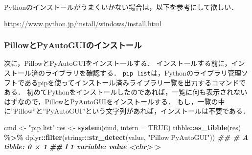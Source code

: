 \documentclass[
]{article}
\newenvironment{Shaded}{\begin{snugshade}}{\end{snugshade}}
\newcommand{\AttributeTok}[1]{\textcolor[rgb]{0.13,0.29,0.53}{#1}}
\newcommand{\ConstantTok}[1]{\textcolor[rgb]{0.56,0.35,0.01}{#1}}
\newcommand{\DocumentationTok}[1]{\textcolor[rgb]{0.56,0.35,0.01}{\textbf{\textit{#1}}}}
\newcommand{\FunctionTok}[1]{\textcolor[rgb]{0.13,0.29,0.53}{\textbf{#1}}}
\newcommand{\NormalTok}[1]{#1}
\newcommand{\OtherTok}[1]{\textcolor[rgb]{0.56,0.35,0.01}{#1}}
\newcommand{\SpecialCharTok}[1]{\textcolor[rgb]{0.81,0.36,0.00}{\textbf{#1}}}
\newcommand{\StringTok}[1]{\textcolor[rgb]{0.31,0.60,0.02}{#1}}
\begin{document}
Pythonのインストールがうまくいかない場合は，以下を参考にして欲しい．

\url{https://www.python.jp/install/windows/install.html}

\hypertarget{pillowux3068pyautoguiux306eux30a4ux30f3ux30b9ux30c8ux30fcux30eb}{%
\subsubsection{PillowとPyAutoGUIのインストール}\label{pillowux3068pyautoguiux306eux30a4ux30f3ux30b9ux30c8ux30fcux30eb}}

次に，PillowとPyAutoGUIをインストールする．
インストールする前に，インストール済のライブラリを確認する．
\texttt{pip\ list}は，Pythonのライブラリ管理ソフトであるpipを使ってインストール済みライブラリ一覧を出力するコマンドである．
初めてPythonをインストールしたのであれば，一覧に何も表示されないはずなので，PillowとPyAutoGUIをインストールする．
もし，一覧の中に''Pillow''と''PyAutoGUI''という文字列があれば，インストールは不要である．

\begin{Shaded}
\begin{Highlighting}[]
\NormalTok{cmd }\OtherTok{\textless{}{-}} \StringTok{"pip list"}
\NormalTok{res }\OtherTok{\textless{}{-}} \FunctionTok{system}\NormalTok{(cmd, }\AttributeTok{intern =} \ConstantTok{TRUE}\NormalTok{)}
\NormalTok{tibble}\SpecialCharTok{::}\FunctionTok{as\_tibble}\NormalTok{(res) }\SpecialCharTok{\%\textgreater{}\%}
\NormalTok{  dplyr}\SpecialCharTok{::}\FunctionTok{filter}\NormalTok{(stringr}\SpecialCharTok{::}\FunctionTok{str\_detect}\NormalTok{(value, }\StringTok{"Pillow|PyAutoGUI"}\NormalTok{))}
\DocumentationTok{\#\# \# A tibble: 0 × 1}
\DocumentationTok{\#\# ℹ 1 variable: value \textless{}chr\textgreater{}}
\SpecialCharTok{\textgreater{}} 
\end{Highlighting}
\end{Shaded}
\end{document}
